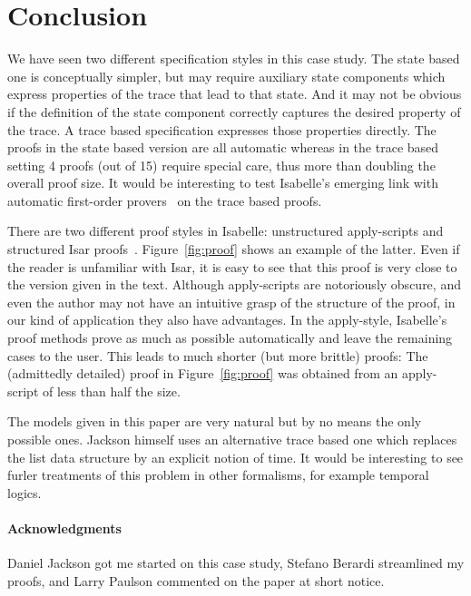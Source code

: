 \section{Conclusion}

We have seen two different specification styles in this case study.
The state based one is conceptually simpler, but may require auxiliary
state components which express properties of the trace that lead to
that state. And it may not be obvious if the definition of the state
component correctly captures the desired property of the trace. A
trace based specification expresses those properties directly.  The
proofs in the state based version are all automatic whereas in the
trace based setting 4 proofs (out of 15) require special care,
thus more than doubling the overall proof size. It would be interesting
to test Isabelle's emerging link with automatic first-order
provers~\cite{MengQP-IC} on the trace based proofs.

There are two different proof styles in Isabelle: unstructured apply-scripts
\cite{LNCS2283} and structured Isar proofs~\cite{Wenzel-PhD,Nipkow-TYPES02}.
Figure~\ref{fig:proof} shows an example of the latter. Even if the
reader is unfamiliar with Isar, it is easy to see that this proof is
very close to the version given in the text. Although apply-scripts
are notoriously obscure, and even the author may not have an intuitive
grasp of the structure of the proof, in our kind of application they
also have advantages. In the apply-style, Isabelle's proof methods
prove as much as possible automatically and leave the remaining cases
to the user. This leads to much shorter (but more brittle) proofs: The
(admittedly detailed) proof in Figure~\ref{fig:proof} was obtained
from an apply-script of less than half the size.

The models given in this paper are very natural but by no means the
only possible ones. Jackson himself uses an alternative trace based
one which replaces the list data structure by an explicit notion of
time. It would be interesting to see furler treatments of this problem
in other formalisms, for example temporal logics.

\paragraph{Acknowledgments}
Daniel Jackson got me started on this case study,
Stefano Berardi streamlined my proofs,
and Larry Paulson commented on the paper at short notice.